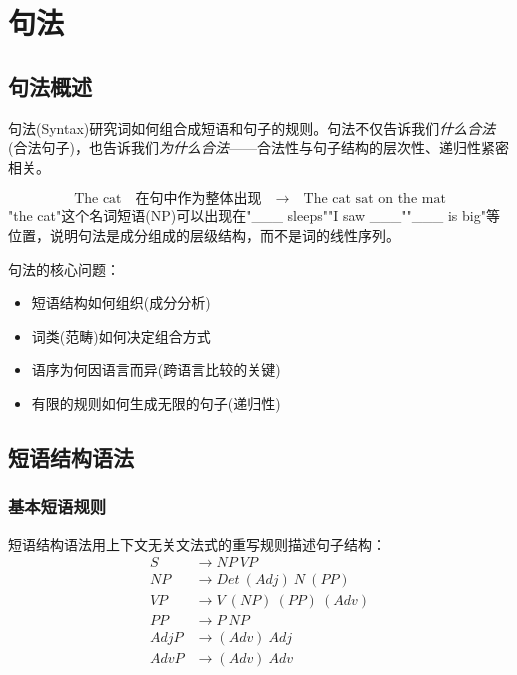 \clearpage
\vspace*{\fill}
\section{句法}
\vspace*{\fill}
\clearpage


\subsection{句法概述}

句法(Syntax)研究词如何组合成短语和句子的规则。句法不仅告诉我们\emph{什么合法}(合法句子)，也告诉我们\emph{为什么合法}——合法性与句子结构的层次性、递归性紧密相关。

\begin{example}[句法的层级性]
\begin{equation}
    \text{The cat} \quad \text{在句中作为整体出现} \quad \rightarrow \quad \text{The cat sat on the mat}
\end{equation}
"the cat"这个名词短语(NP)可以出现在"\_\_\_ sleeps""I saw \_\_\_""\_\_\_ is big"等位置，说明句法是成分组成的层级结构，而不是词的线性序列。
\end{example}

句法的核心问题：
\begin{itemize}
    \item 短语结构如何组织(成分分析)
    \item 词类(范畴)如何决定组合方式
    \item 语序为何因语言而异(跨语言比较的关键)
    \item 有限的规则如何生成无限的句子(递归性)
\end{itemize}

\subsection{短语结构语法}

\subsubsection{基本短语规则}

短语结构语法用上下文无关文法式的重写规则描述句子结构：
\begin{equation}
    \begin{aligned}
    S &\rightarrow NP \ VP \\
    NP &\rightarrow Det \ (Adj) \ N \ (PP) \\
    VP &\rightarrow V \ (NP) \ (PP) \ (Adv) \\
    PP &\rightarrow P \ NP \\
    AdjP &\rightarrow (Adv) \ Adj \\
    AdvP &\rightarrow (Adv) \ Adv
    \end{aligned}
\end{equation}

